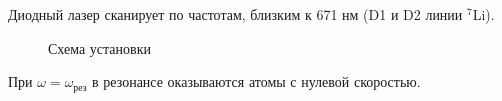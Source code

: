 Диодный лазер сканирует по частотам, близким к 671 нм (D1 и D2 линии ${}^7$Li).

\begin{figure}[h]
    \centering
    \caption{Схема установки}
\end{figure}

При $\omega = \omega_{\text{рез}}$ в резонансе оказываются атомы с нулевой скоростью.
